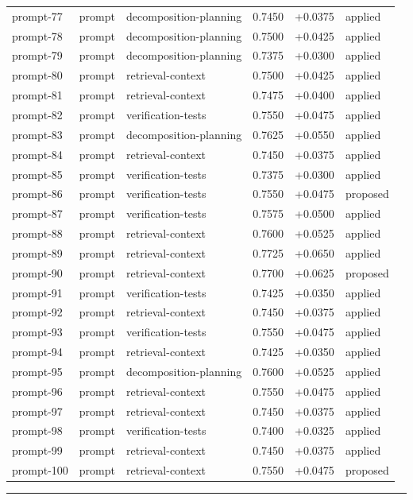\begin{center}
\begin{longtable}{llp{5.2cm}rrl}
prompt-77 & prompt & decomposition-planning & 0.7450 & +0.0375 & applied \\
prompt-78 & prompt & decomposition-planning & 0.7500 & +0.0425 & applied \\
prompt-79 & prompt & decomposition-planning & 0.7375 & +0.0300 & applied \\
prompt-80 & prompt & retrieval-context & 0.7500 & +0.0425 & applied \\
prompt-81 & prompt & retrieval-context & 0.7475 & +0.0400 & applied \\
prompt-82 & prompt & verification-tests & 0.7550 & +0.0475 & applied \\
prompt-83 & prompt & decomposition-planning & 0.7625 & +0.0550 & applied \\
prompt-84 & prompt & retrieval-context & 0.7450 & +0.0375 & applied \\
prompt-85 & prompt & verification-tests & 0.7375 & +0.0300 & applied \\
prompt-86 & prompt & verification-tests & 0.7550 & +0.0475 & proposed \\
prompt-87 & prompt & verification-tests & 0.7575 & +0.0500 & applied \\
prompt-88 & prompt & retrieval-context & 0.7600 & +0.0525 & applied \\
prompt-89 & prompt & retrieval-context & 0.7725 & +0.0650 & applied \\
prompt-90 & prompt & retrieval-context & 0.7700 & +0.0625 & proposed \\
prompt-91 & prompt & verification-tests & 0.7425 & +0.0350 & applied \\
prompt-92 & prompt & retrieval-context & 0.7450 & +0.0375 & applied \\
prompt-93 & prompt & verification-tests & 0.7550 & +0.0475 & applied \\
prompt-94 & prompt & retrieval-context & 0.7425 & +0.0350 & applied \\
prompt-95 & prompt & decomposition-planning & 0.7600 & +0.0525 & applied \\
prompt-96 & prompt & retrieval-context & 0.7550 & +0.0475 & applied \\
prompt-97 & prompt & retrieval-context & 0.7450 & +0.0375 & applied \\
prompt-98 & prompt & verification-tests & 0.7400 & +0.0325 & applied \\
prompt-99 & prompt & retrieval-context & 0.7450 & +0.0375 & applied \\
prompt-100 & prompt & retrieval-context & 0.7550 & +0.0475 & proposed \\
\bottomrule\end{longtable}\end{center}
\par\bigskip\hrule\bigskip
